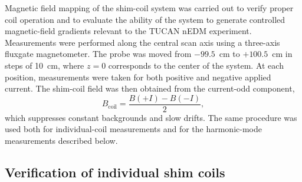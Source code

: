 \documentclass[preprint,12pt]{elsarticle}
\begin{document}
Magnetic field mapping of the shim-coil system was carried out to
verify proper coil operation and to evaluate the ability of the system
to generate controlled magnetic-field gradients relevant to the TUCAN
nEDM experiment. Measurements were performed along the central scan
axis using a three-axis fluxgate magnetometer. The probe was moved
from $-99.5$~cm to $+100.5$~cm in steps of 10~cm, where $z=0$
corresponds to the center of the system. At each position,
measurements were taken for both positive and negative applied
current. The shim-coil field was then obtained from the current-odd
component,
\begin{equation}
  B_{\mathrm{coil}}=\frac{B(+I)-B(-I)}{2},
\end{equation}
which suppresses constant backgrounds and slow drifts. The same
procedure was used both for individual-coil measurements and for the
harmonic-mode measurements described below.


\subsection{Verification of individual shim coils}
\end{document}
